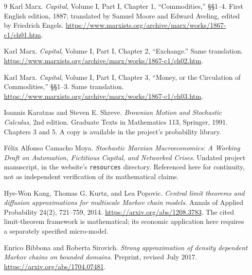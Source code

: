 \documentclass[11pt,letterpaper]{article}
\begin{document}
\begin{thebibliography}{9}
Karl Marx. \emph{Capital}, Volume I, Part I, Chapter 1,
``Commodities,'' §§1--4. First English edition, 1887; translated by
Samuel Moore and Edward Aveling, edited by Friedrich Engels.
\url{https://www.marxists.org/archive/marx/works/1867-c1/ch01.htm}.

Karl Marx. \emph{Capital}, Volume I, Part I, Chapter 2,
``Exchange.'' Same translation.
\url{https://www.marxists.org/archive/marx/works/1867-c1/ch02.htm}.

Karl Marx. \emph{Capital}, Volume I, Part I, Chapter 3,
``Money, or the Circulation of Commodities,'' §§1--3. Same translation.
\url{https://www.marxists.org/archive/marx/works/1867-c1/ch03.htm}.

Ioannis Karatzas and Steven E. Shreve.
\emph{Brownian Motion and Stochastic Calculus}, 2nd edition.
Graduate Texts in Mathematics 113, Springer, 1991.
Chapters 3 and 5. A copy is available in the project's probability library.

F\'elix Alfonso Camacho Moya. \emph{Stochastic Marxian Macroeconomics:
A Working Draft on Automation, Fictitious Capital, and Networked Crises}.
Undated project manuscript, in the website's \texttt{resources} directory.
Referenced here for continuity, not as independent verification of its
mathematical claims.

Hye-Won Kang, Thomas G. Kurtz, and Lea Popovic.
\emph{Central limit theorems and diffusion approximations for multiscale
Markov chain models}. Annals of Applied Probability
24(2), 721--759, 2014.
\url{https://arxiv.org/abs/1208.3783}.
The cited limit-theorem framework is mathematical; its economic
application here requires a separately specified micro-model.

Enrico Bibbona and Roberta Sirovich.
\emph{Strong approximation of density dependent Markov chains on bounded
domains}. Preprint, revised July 2017.
\url{https://arxiv.org/abs/1704.07481}.
\end{thebibliography}
\end{document}
